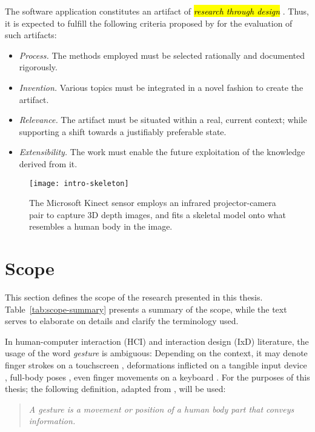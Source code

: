 The software application constitutes an artifact of \hl{\emph{research through design}} \parencite{Frayling:1993}. Thus, it is expected to fulfill the following criteria proposed by \textcite{Zimmerman:2007} for the evaluation of such artifacts:

\begin{itemize}
\item \emph{Process.} The methods employed must be selected rationally and documented rigorously.
\item \emph{Invention.} Various topics must be integrated in a novel fashion to create the artifact.
\item \emph{Relevance.} The artifact must be situated within a real, current context; while supporting a shift towards a justifiably preferable state.
\item \emph{Extensibility.} The work must enable the future exploitation of the knowledge derived from it.
\end{itemize}

\begin{SCfigure}[\sidecaptionrelwidth][b]
\centering
\texttt{[image: intro-skeleton]}
\caption{The Microsoft Kinect sensor employs an infrared projector-camera pair to capture 3D depth images, and fits a skeletal model onto what resembles a  human body in the image.}
\label{fig:intro-skeleton}
\end{SCfigure}

\section{Scope}
\label{sec:scope}

This section defines the scope of the research presented in this thesis. Table~\ref{tab:scope-summary} presents a summary of the scope, while the text serves to elaborate on details and clarify the terminology used.

In human-computer interaction (HCI) and interaction design (IxD) literature, the usage of the word \emph{gesture} is ambiguous: Depending on the context, it may denote finger strokes on a touchscreen \parencite{Lu:2013}, deformations inflicted on a tangible input device \parencite{Warren:2013}, full-body poses \parencite{Walter:2013}, even finger movements on a keyboard \parencite{Zhang:2014}. For the purposes of this thesis; the following definition, adapted from \textcite{Kurtenbach:1990}, will be used:

\begin{quote}
\emph{A gesture is a movement or position of a human body part that conveys information.}
\end{quote}

